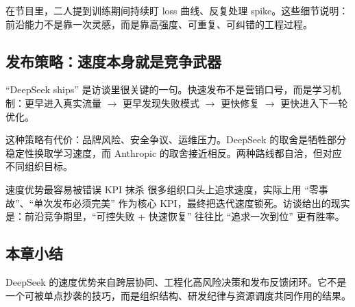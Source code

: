 在节目里，二人提到训练期间持续盯 loss 曲线、反复处理 spike。这些细节说明：前沿能力不是靠一次灵感，而是靠高强度、可重复、可纠错的工程过程。

\subsection{发布策略：速度本身就是竞争武器}

``DeepSeek ships'' 是访谈里很关键的一句。快速发布不是营销口号，而是学习机制：更早进入真实流量 $\to$ 更早发现失败模式 $\to$ 更快修复 $\to$ 更快进入下一轮优化。

这种策略有代价：品牌风险、安全争议、运维压力。DeepSeek 的取舍是牺牲部分稳定性换取学习速度，而 Anthropic 的取舍接近相反。两种路线都自洽，但对应不同组织目标。

\begin{warningbox}{速度优势最容易被错误 KPI 抹杀}
很多组织口头上追求速度，实际上用 ``零事故''、``单次发布必须完美'' 作为核心 KPI，最终把迭代速度锁死。访谈给出的现实是：前沿竞争期里，``可控失败 + 快速恢复'' 往往比 ``追求一次到位'' 更有胜率。
\end{warningbox}

\subsection{本章小结}

DeepSeek 的速度优势来自跨层协同、工程化高风险决策和发布反馈闭环。它不是一个可被单点抄袭的技巧，而是组织结构、研发纪律与资源调度共同作用的结果。

